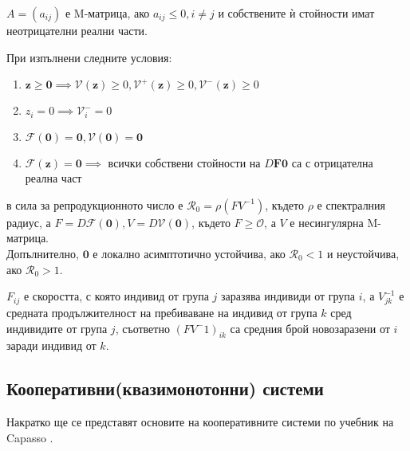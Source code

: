 \begin{definition}[M-матрица]
  $A = (a_{ij})$ е M-матрица, ако $a_{ij} \leq 0, i \neq j$ и собствените ѝ стойности имат неотрицателни реални части.
\end{definition}
\begin{theorem}
  При изпълнени следните условия:
  \begin{enumerate}
    \item $\mathbf{z} \geq \mathbf{0} \implies \mathscr{V}(\mathbf{z}) \geq 0, \mathscr{V}^+(\mathbf{z}) \geq 0, \mathscr{V}^-(\mathbf{z}) \geq 0$
    \item $z_i = 0 \implies \mathscr{V}_{i}^- = 0$
    \item $\mathscr{F}(\mathbf{0}) = \mathbf{0}, \mathscr{V}(\mathbf{0}) = \mathbf{0}$
    \item $\mathscr{F}(\mathbf{z}) = \mathbf{0} \implies$ всички собствени стойности на $D\mathbf{F}{\mathbf{0}}$ са с отрицателна реална част
  \end{enumerate}
  в сила за репродукционното число е $\mathscr{R}_0 = \rho(F V^{-1})$, където $\rho$ е спектралния радиус, а $F = D\mathscr{F}(\mathbf{0}), V = D\mathscr{V}(\mathbf{0})$, където $F \geq \mathscr{O}$, а $V$ е несингулярна M-матрица. \\
  Допълнително, $\mathbf{0}$ е локално асимптотично устойчива, ако $\mathscr{R}_0 < 1$ и неустойчива, ако $\mathscr{R}_0 > 1$.
\end{theorem}

$F_{ij}$ е скоростта, с която индивид от група $j$ заразява индивиди от група $i$, а $V^{-1}_{jk}$ е средната продължителност на пребиваване на индивид от група $k$ сред индивидите от група $j$, съответно $(F V^-1)_{ik}$ са средния брой новозаразени от $i$ заради индивид от $k$.

\subsection{Кооперативни(квазимонотонни) системи}
Накратко ще се представят основите на кооперативните системи по учебник на Capasso \cite{Capasso2008}.

